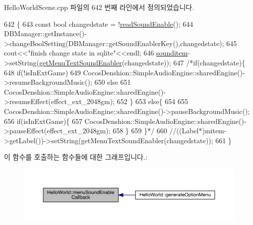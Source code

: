 Hello\+World\+Scene.\+cpp 파일의 642 번째 라인에서 정의되었습니다.


\begin{DoxyCode}
642                                                            \{
643     \textcolor{keyword}{const} \textcolor{keywordtype}{bool} changedstate = !\hyperlink{class_hello_world_a0f8c9d1b95e03b397e680b9dafb8f3d9}{readSoundEnable}();
644     DBManager::getInstance()->changeBoolSetting(DBManager::getSoundEnablerKey(),changedstate);
645     cout<<\textcolor{stringliteral}{"finish change state in sqlite"}<<endl;
646     \hyperlink{class_hello_world_adb09915c0ac4077d51f46e2645bc4c0a}{sounditem}->setString(\hyperlink{class_hello_world_a85e65e13718aba32a3a35044f0f694c5}{getMenuTextSoundEnabler}(changedstate));
647     \textcolor{comment}{/*if(changedstate)\{}
648 \textcolor{comment}{        if(!isInExtGame)}
649 \textcolor{comment}{        CocosDenshion::SimpleAudioEngine::sharedEngine()->resumeBackgroundMusic();}
650 \textcolor{comment}{        else}
651 \textcolor{comment}{            CocosDenshion::SimpleAudioEngine::sharedEngine()->resumeEffect(effect\_ext\_2048gm);}
652 \textcolor{comment}{    \}}
653 \textcolor{comment}{    else\{}
654 \textcolor{comment}{        }
655 \textcolor{comment}{        CocosDenshion::SimpleAudioEngine::sharedEngine()->pauseBackgroundMusic();}
656 \textcolor{comment}{        if(isInExtGame)\{}
657 \textcolor{comment}{            CocosDenshion::SimpleAudioEngine::sharedEngine()->pauseEffect(effect\_ext\_2048gm);}
658 \textcolor{comment}{        \}}
659 \textcolor{comment}{    \}*/}
660     \textcolor{comment}{//((Label*)mitem->getLabel())->setString(getMenuTextSoundEnabler(changedstate));}
661 \}
\end{DoxyCode}
이 함수를 호출하는 함수들에 대한 그래프입니다.\+:
\nopagebreak
\begin{figure}[H]
\begin{center}
\leavevmode
\includegraphics[width=350pt]{d9/d98/class_hello_world_aa0aab5c2537449752853c2924db53261_icgraph}
\end{center}
\end{figure}
\mbox{\label{class_hello_world_a38047ef68d46872dd39be5d4cc59ad18}} 
